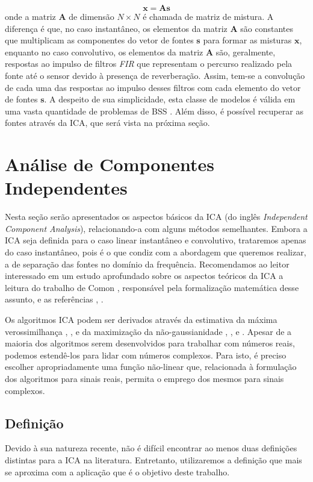      \begin{equation}\label{eq:xn}
        \mathbf{x} = \mathbf{A}\mathbf{s}
    \end{equation}
    onde a matriz $\mathbf{A}$ de dimensão ${N \times N}$ é chamada de matriz de mistura. A diferença é que, no caso instantâneo, os elementos da matriz $\mathbf{A}$ são constantes que multiplicam as componentes do vetor de fontes $\mathbf{s}$ para formar as misturas $\mathbf{x}$, enquanto no caso convolutivo, os elementos da matriz $\mathbf{A}$ são, geralmente, respostas ao impulso de filtros \textit{FIR} que representam o percurso realizado pela fonte até o sensor devido à presença de reverberação. Assim, tem-se a convolução de cada uma das respostas ao impulso desses filtros com cada elemento do vetor de fontes $\mathbf{s}$. A despeito de sua simplicidade, esta classe de modelos é válida em uma vasta quantidade de problemas de BSS \cite{ICA}. Além disso, é possível recuperar as fontes através da ICA, que será vista na próxima seção.

\section{Análise de Componentes Independentes} \label{sec:ICA}
    Nesta seção serão apresentados os aspectos básicos da ICA (do inglês \textit{Independent Component Analysis}), relacionando-a com alguns métodos semelhantes. Embora a ICA seja definida para o caso linear instantâneo e convolutivo, trataremos apenas do caso instantâneo, pois é o que condiz com a abordagem que queremos realizar, a de separação das fontes no domínio da frequência. Recomendamos ao leitor interessado em um estudo aprofundado sobre os aspectos teóricos da ICA a leitura do trabalho de Comon \cite{Comon}, responsável pela formalização matemática desse assunto, e as referências \cite{ICA3}, \cite{ICA}.
    
    Os algoritmos ICA podem ser derivados através da estimativa da máxima verossimilhança \cite{ICAML}, \cite{ML}, \cite{NaturalICA} e da maximização da não-gaussianidade \cite{fastica1}, \cite{fastica2}, \cite{fastica3} e \cite{fasticaebm}. Apesar de a maioria dos algoritmos serem desenvolvidos para trabalhar com números reais, podemos estendê-los para lidar com números complexos. Para isto, é preciso escolher apropriadamente uma função não-linear que, relacionada à formulação dos algoritmos para sinais reais, permita o emprego dos mesmos para sinais complexos.

\subsection{Definição}
    Devido à sua natureza recente, não é difícil encontrar ao menos duas definições distintas para a ICA na literatura. Entretanto, utilizaremos a definição que mais se aproxima com a aplicação que é o objetivo deste trabalho.
    
